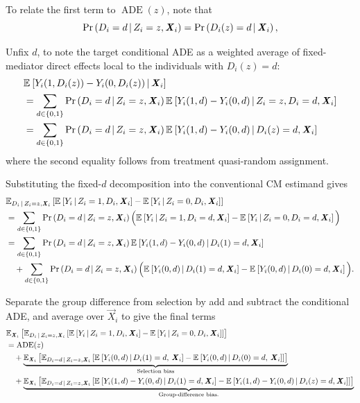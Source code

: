 To relate the first term to $\operatorname{ADE}(z)$, note that
\[
    \Probgiven{D_i=d}{Z_i=z,\vec X_i}
    =
    \Probgiven{D_i(z)=d}{\vec X_i},
\]

Unfix $d$, to note the target conditional ADE as a weighted average of fixed-mediator direct effects local to the individuals with $D_i(z) = d$:
\begin{align*}
    & \Egiven{
        Y_i(1,D_i(z))-Y_i(0,D_i(z))
    }{\vec X_i}
    \\
    &=
    \sum_{d \in \{0,1\}}
    \Probgiven{D_i=d}{Z_i=z,\vec X_i}
    \Egiven{
        Y_i(1,d)-Y_i(0,d)
    }{
        Z_i=z,D_i = d,\vec X_i
    }
    \\
    &=
    \sum_{d \in \{0,1\}}
    \Probgiven{D_i=d}{Z_i=z,\vec X_i}
    \Egiven{
        Y_i(1,d)-Y_i(0,d)
    }{
        D_i(z)=d,\vec X_i
    }
\end{align*}
where the second equality follows from treatment quasi-random assignment.

Substituting the fixed-$d$ decomposition into the conventional CM estimand gives
\begin{align*}
    &\E[D_i \,\mid\, Z_i=z, \vec X_i]{
        \Egiven{Y_i}{Z_i=1,D_i,\vec X_i} - \Egiven{Y_i}{Z_i=0,D_i,\vec X_i}} \\
    &=\sum_{d \in \{0,1\}} \Probgiven{D_i=d}{Z_i=z,\vec X_i} \Big(
        \Egiven{Y_i}{Z_i=1,D_i=d,\vec X_i} - \Egiven{Y_i}{Z_i=0,D_i=d,\vec X_i} \Big) \\
    &=
    \sum_{d \in \{0,1\}}
    \Probgiven{D_i=d}{Z_i=z,\vec X_i}
    \Egiven{
        Y_i(1,d)-Y_i(0,d)
    }{
        D_i(1)=d,\vec X_i
    }
    \\
    &\quad+
    \sum_{d \in \{0,1\}}
    \Probgiven{D_i=d}{Z_i=z,\vec X_i}
    \Big(
        \Egiven{Y_i(0,d)}
            {D_i(1)=d,\vec X_i}
        -
        \Egiven{Y_i(0,d)}
            {D_i(0)=d,\vec X_i}
    \Big).
\end{align*}

Separate the group difference from selection by add and subtract the conditional ADE, and average over $\vec X_i$ to give the final terms
\begin{align*}
    &\E[\vec X_i]{\E[D_i \,\mid\, Z_i=z, \vec X_i]{
        \Egiven{Y_i}{Z_i=1,D_i,\vec X_i} - \Egiven{Y_i}{Z_i=0,D_i,\vec X_i}}} \\
    &= \text{ADE}(z) \\
    &\quad+
    \underbrace{ \E[\vec X_i]{
        \E[D_i = d\,| \, Z_i = z, \vec X_i]{
            \Egiven{Y_i(0,d)}
                {D_i(1)=d,\,\vec X_i}
            -
            \Egiven{Y_i(0,d)}
                {D_i(0)=d,\,\vec X_i}}}
    }_{
        \text{Selection bias}
    }
    \\
    &\quad+
    \underbrace{
        \E[\vec X_i]{\E[D_i = d \,| \, Z_i = z, \vec X_i]{
            \Egiven{
                Y_i(1,d)-Y_i(0,d)
            }{
                D_i(1)=d,\vec X_i
            }
            -
            \Egiven{
                Y_i(1,d)-Y_i(0,d)
            }{
                D_i(z)=d,\vec X_i
            }}}
    }_{
        \text{Group-difference bias.}
    }
\end{align*}

